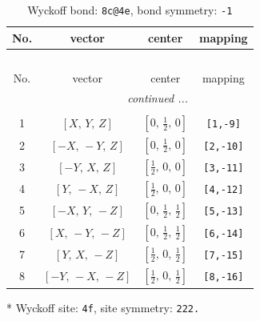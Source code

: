 \documentclass[fleqn,8pt]{jsarticle}
\begin{document}
\renewcommand{\arraystretch}{1.2}
\begin{longtable}{cccc}
\caption{Wyckoff bond: {\tt 8c@4e}, bond symmetry: {\tt -1}}
 \\
 \hline \hline
No. & vector & center & mapping \\ \hline \endfirsthead

\multicolumn{3}{l}{\tablename\ \thetable{}} \\
 \hline \hline
No. & vector & center & mapping \\ \hline \endhead

 \hline \hline
\multicolumn{3}{r}{\footnotesize\it continued ...} \\ \endfoot

 \hline \hline
\multicolumn{3}{r}{} \\ \endlastfoot

1 & $\left[ X,\, Y,\, Z \right]$ & $\left[ 0,\, \frac{1}{2},\, 0 \right]$ & {\tt [1,-9]} \\ \hline
2 & $\left[ - X,\, - Y,\, Z \right]$ & $\left[ 0,\, \frac{1}{2},\, 0 \right]$ & {\tt [2,-10]} \\ \hline
3 & $\left[ - Y,\, X,\, Z \right]$ & $\left[ \frac{1}{2},\, 0,\, 0 \right]$ & {\tt [3,-11]} \\ \hline
4 & $\left[ Y,\, - X,\, Z \right]$ & $\left[ \frac{1}{2},\, 0,\, 0 \right]$ & {\tt [4,-12]} \\ \hline
5 & $\left[ - X,\, Y,\, - Z \right]$ & $\left[ 0,\, \frac{1}{2},\, \frac{1}{2} \right]$ & {\tt [5,-13]} \\ \hline
6 & $\left[ X,\, - Y,\, - Z \right]$ & $\left[ 0,\, \frac{1}{2},\, \frac{1}{2} \right]$ & {\tt [6,-14]} \\ \hline
7 & $\left[ Y,\, X,\, - Z \right]$ & $\left[ \frac{1}{2},\, 0,\, \frac{1}{2} \right]$ & {\tt [7,-15]} \\ \hline
8 & $\left[ - Y,\, - X,\, - Z \right]$ & $\left[ \frac{1}{2},\, 0,\, \frac{1}{2} \right]$ & {\tt [8,-16]} \\
\end{longtable}
* Wyckoff site: {\tt 4f}, site symmetry: {\tt 222.}
\renewcommand{\arraystretch}{1.2}
\end{document}
